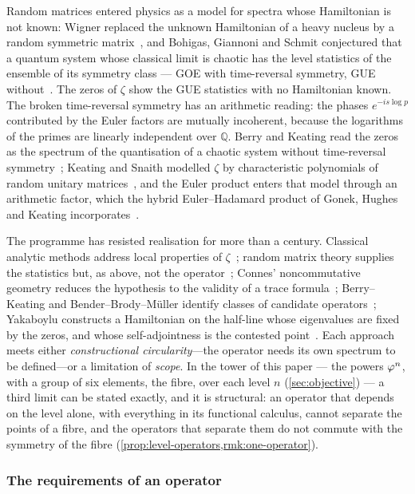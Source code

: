 Random matrices entered physics as a model for spectra whose Hamiltonian is not known: Wigner
replaced the unknown Hamiltonian of a heavy nucleus by a random symmetric matrix~\cite{wigner51},
and Bohigas, Giannoni and Schmit conjectured that a quantum system whose classical limit is chaotic
has the level statistics of the ensemble of its symmetry class --- GOE with time-reversal symmetry,
GUE without~\cite{bgs84}.  The zeros of $\zeta$ show the GUE statistics with no Hamiltonian known.
The broken time-reversal symmetry has an arithmetic reading: the phases $e^{-is\log p}$ contributed
by the Euler factors are mutually incoherent, because the logarithms of the primes are linearly
independent over $\mathbb{Q}$.  Berry and Keating read the zeros as the spectrum of the quantisation
of a chaotic system without time-reversal symmetry~\cite{berry99}; Keating and Snaith modelled $\zeta$
by characteristic polynomials of random unitary matrices~\cite{keating00}, and the Euler product
enters that model through an arithmetic factor, which the hybrid Euler--Hadamard product of Gonek,
Hughes and Keating incorporates~\cite{gonekhugheskeating07}.

The programme has resisted realisation for more than a century.  Classical
analytic methods address local properties of $\zeta$~\cite{hardy14,vinogradov47,titchmarsh86};
random matrix theory supplies the statistics but, as above, not the
operator~\cite{keating00,katz99}; Connes' noncommutative geometry reduces the
hypothesis to the validity of a trace formula~\cite{connes99,connes95};
Berry--Keating and Bender--Brody--M\"uller identify classes of candidate
operators~\cite{berry99,bender17}; Yakaboylu constructs a Hamiltonian on the half-line whose eigenvalues are fixed by the zeros, and whose self-adjointness is the contested point~\cite{yakaboylu24}.
Each approach meets either \emph{constructional circularity}---the operator
needs its own spectrum to be defined---or a limitation of \emph{scope}.
In the tower of this paper --- the powers $\varphi^n$, with a group of six elements, the fibre, over each level $n$
(\cref{sec:objective}) --- a third limit can be stated exactly, and it is structural:
an operator that depends on the level alone, with everything in its functional calculus, cannot
separate the points of a fibre, and the operators that separate them do not commute with the
symmetry of the fibre (\cref{prop:level-operators,rmk:one-operator}).

\subsubsection{The requirements of an operator}\label{ssec:four-requirements}

